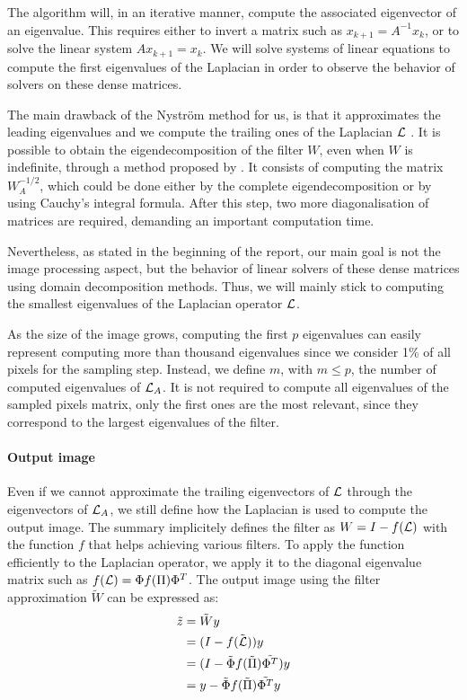 The algorithm will, in an iterative manner, compute the associated eigenvector of an eigenvalue.
This requires either to invert a matrix such as \(x_{k+1} = A^{-1} x_k\), or to solve the linear system \(A x_{k+1} = x_k\).
We will solve systems of linear equations to compute the first eigenvalues of the Laplacian in order to observe the behavior of solvers on these dense matrices.

The main drawback of the Nystr\"om method for us, is that it approximates the leading eigenvalues and we compute the trailing ones of the Laplacian \(\operatorname{\mathcal{L}}\) \cite{belongie_spectral_2002}.
It is possible to obtain the eigendecomposition of the filter \(W\), even when \(W\) is indefinite, through a method proposed by \cite{fowlkes_spectral_2004}.
It consists of computing the matrix \(W_A^{-1/2}\), which could be done either by the complete eigendecomposition or by using Cauchy's integral formula.
After this step, two more diagonalisation of matrices are required, demanding an important computation time.

Nevertheless, as stated in the beginning of the report, our main goal is not the image processing aspect, but the behavior of linear solvers of these dense matrices using domain decomposition methods.
Thus, we will mainly stick to computing the smallest eigenvalues of the Laplacian operator \(\operatorname{\mathcal{L}}\).

As the size of the image grows, computing the first \(p\) eigenvalues can easily represent computing more than thousand eigenvalues since we consider 1\% of all pixels for the sampling step.
Instead, we define \(m\), with \(m \le p\), the number of computed eigenvalues of \(\operatorname{\mathcal{L}}_A\).
It is not required to compute all eigenvalues of the sampled pixels matrix, only the first ones are the most relevant, since they correspond to the largest eigenvalues of the filter.

\paragraph{Output image}
Even if we cannot approximate the trailing eigenvectors of \(\operatorname{\mathcal{L}}\) through the eigenvectors of \(\operatorname{\mathcal{L}}_A\), we still define how the Laplacian is used to compute the output image.
The summary \cite{modern_tour_2013} implicitely defines the filter as \(W = I - f(\operatorname{\mathcal{L}})\) with the function \(f\) that helps achieving various filters.
To apply the function efficiently to the Laplacian operator, we apply it to the diagonal eigenvalue matrix such as \(f(\operatorname{\mathcal{L}}) = \Phi f(\Pi) \Phi^T\).
The output image using the filter approximation \(\tilde{W}\) can be expressed as:
\begin{equation}
 \begin{split}
     \tilde{z} & = \tilde{W}y \\
               & = (I - f(\tilde{\operatorname{\mathcal{L}}})) y \\
               & = (I - \tilde{\Phi} f(\tilde{\Pi}) \tilde{\Phi^T}) y \\
               & = y - \tilde{\Phi} f(\tilde{\Pi}) \tilde{\Phi^T} y
 \end{split}
\end{equation}

